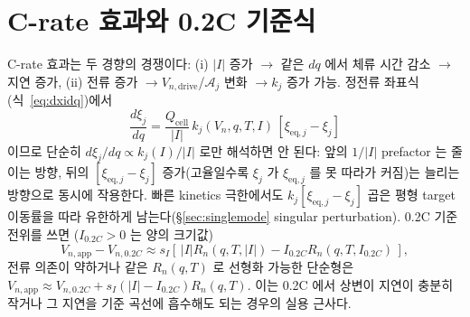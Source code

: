 \documentclass[11pt,a4paper]{article}
\newcommand{\eq}{\mathrm{eq}}
\newcommand{\app}{\mathrm{app}}
\newcommand{\drive}{\mathrm{drive}}
\newcommand{\cell}{\mathrm{cell}}
\begin{document}
\section{C-rate 효과와 0.2C 기준식}\label{sec:crate}
C-rate 효과는 두 경향의 경쟁이다: (i) $|I|$ 증가 $\to$ 같은 $dq$ 에서 체류 시간 감소 $\to$ 지연 증가,
(ii) 전류 증가 $\to V_{n,\drive}$/$\mathcal A_j$ 변화 $\to k_j$ 증가 가능. 정전류 좌표식
(식~\eqref{eq:dxidq})에서
\begin{equation}
\frac{d\xi_j}{dq}=\frac{Q_\cell}{|I|}\,k_j(V_n,q,T,I)\,[\xi_{\eq,j}-\xi_j]
\label{eq:crate}
\end{equation}
이므로 단순히 $d\xi_j/dq\propto k_j(I)/|I|$ 로만 해석하면 안 된다: 앞의 $1/|I|$ prefactor 는 줄이는
방향, 뒤의 $[\xi_{\eq,j}-\xi_j]$ 증가(고율일수록 $\xi_j$ 가 $\xi_{\eq,j}$ 를 못 따라가 커짐)는 늘리는
방향으로 동시에 작용한다. 빠른 kinetics 극한에서도 $k_j[\xi_{\eq,j}-\xi_j]$ 곱은 평형 target 이동률을
따라 유한하게 남는다(\S\ref{sec:singlemode} singular perturbation). 0.2C 기준 전위를 쓰면
($I_{0.2C}>0$ 는 양의 크기값)
\begin{equation}
V_{n,\app}-V_{n,0.2C}\approx s_I[\,|I|R_n(q,T,|I|)-I_{0.2C}R_n(q,T,I_{0.2C})\,],
\label{eq:02c_gen}
\end{equation}
전류 의존이 약하거나 같은 $R_n(q,T)$ 로 선형화 가능한 단순형은
$V_{n,\app}\approx V_{n,0.2C}+s_I(|I|-I_{0.2C})R_n(q,T)$. 이는 0.2C 에서 상변이 지연이 충분히 작거나 그
지연을 기준 곡선에 흡수해도 되는 경우의 실용 근사다.

\end{document}
